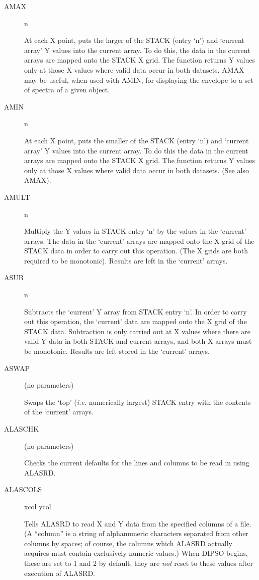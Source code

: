 \begin {description}
\item [AMAX] n

At each X point, puts the larger of the STACK (entry `n') and `current
array' Y values into the current array. To do this, the data in the
current arrays are mapped onto the STACK X grid. The function returns
Y values only at those X values where valid data occur in both
datasets. AMAX may be useful, when used with AMIN, for displaying the
envelope to a set of spectra of a given object.

\item [AMIN] n

At each X point, puts the smaller of the STACK (entry `n') and
`current array' Y values into the current array. To do this the data
in the current arrays are mapped onto the STACK X grid. The function
returns Y values only at those X values where valid data occur in both
datasets. (See also AMAX).

\item [AMULT] n

Multiply the Y values in STACK entry `n' by the values in the
`current' arrays. The data in the `current' arrays are mapped onto the
X grid of the STACK data in order to carry out this operation. (The X
grids are both required to be monotonic). Results are left in the
`current' arrays.

\item [ASUB] n

Subtracts the `current' Y array from STACK entry `n'. In order to
carry out this operation, the `current' data are mapped onto the X
grid of the STACK data. Subtraction is only carried out at X values
where there are valid Y data in both STACK and current arrays, and
both X arrays must be monotonic. Results are left stored in the
`current' arrays.

\item [ASWAP] (no parameters)

Swaps the `top' ({\em i.e.} numerically largest) STACK entry with the
contents of the `current' arrays.

\item [ALASCHK] (no parameters)

Checks the current defaults for the lines and columns to be read in
using ALASRD.

\item [ALASCOLS] xcol ycol

Tells ALASRD to read X and Y data from the specified columns of a
file. (A ``column'' is a string of alphanumeric characters separated
from other columns by spaces;  of course, the columns which ALASRD
actually acquires must contain exclusively numeric values.) When DIPSO
begins, these are set to 1 and 2 by default; they are {\em not} reset
to these values after execution of ALASRD.


\end{description}
